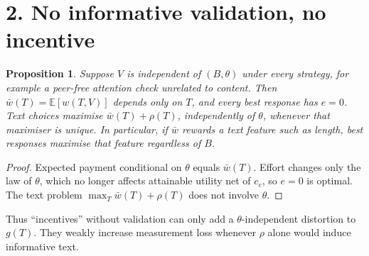 \documentclass[11pt]{article}
\newtheorem{proposition}[theorem]{Proposition}
\theoremstyle{definition}
\begin{document}
\section*{2. No informative validation, no incentive}
\begin{proposition}\label{prop:imp}
Suppose $V$ is independent of $(B,\theta)$ under every strategy, for example a peer-free attention check unrelated to
content. Then $\bar w(T)=\mathbb E[w(T,V)]$ depends only on $T$, and every best response has $e=0$. Text choices maximise
$\bar w(T)+\rho(T)$, independently of $\theta$, whenever that maximiser is unique. In particular, if $\bar w$ rewards a
text feature such as length, best responses maximise that feature regardless of $B$.
\end{proposition}
\begin{proof}
Expected payment conditional on $\theta$ equals $\bar w(T)$. Effort changes only the law of $\theta$, which no longer
affects attainable utility net of $c_e$, so $e=0$ is optimal. The text problem $\max_T\bar w(T)+\rho(T)$ does not involve
$\theta$.
\end{proof}
Thus ``incentives'' without validation can only add a $\theta$-independent distortion to $g(T)$. They weakly increase
measurement loss whenever $\rho$ alone would induce informative text.
\end{document}
